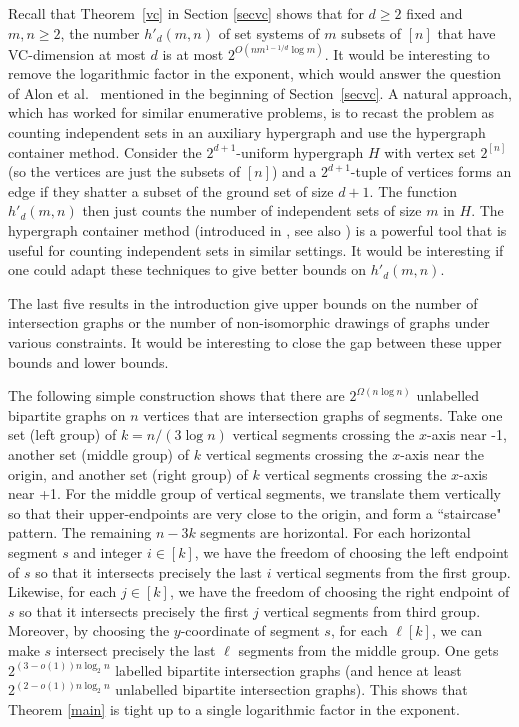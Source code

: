 \documentclass[11pt]{article}
\theoremstyle{plain}
\theoremstyle{definition}
\theoremstyle{remark}
\begin{document}
Recall that Theorem~\ref{vc} in Section \ref{secvc} shows that for $d \geq 2$ fixed and $m,n \geq 2$, the number $h'_d(m,n)$ of set systems of $m$ subsets of $[n]$ that have VC-dimension at most $d$ is at most $2^{O(nm^{1-1/d}\log m)}$. It would be interesting to remove the logarithmic factor in the exponent, which would answer the question of Alon et al.~\cite{alon} mentioned in the beginning of Section~\ref{secvc}. A natural approach, which has worked for similar enumerative problems, is to recast the problem as counting independent sets in an auxiliary hypergraph and use the hypergraph container method. Consider the $2^{d+1}$-uniform hypergraph $H$ with vertex set $2^{[n]}$ (so the vertices are just the subsets of $[n]$) and a $2^{d+1}$-tuple of vertices forms an edge if they shatter a subset of the ground set of size $d+1$. The function $h'_{d}(m,n)$ then just counts the number of independent sets of size $m$ in $H$. The hypergraph container method (introduced in \cite{BMS0,ST15}, see also \cite{BMS}) is a powerful tool that is useful for counting independent sets in similar settings. It would be interesting if one could adapt these techniques to give better bounds on $h'_d(m,n)$. 

The last five results in the introduction give upper bounds on the number of intersection graphs or the number of non-isomorphic drawings of graphs under various constraints. It would be interesting to close the gap between these upper bounds and lower bounds. 

The following simple construction shows that there are $2^{\Omega(n\log n)}$ unlabelled bipartite graphs on $n$ vertices that are intersection graphs of segments. Take one set (left group) of $k=n/(3\log n)$ vertical segments crossing the $x$-axis near -1, another set (middle group) of $k$ vertical segments crossing the $x$-axis near the origin, and another set (right group) of $k$ vertical segments crossing the $x$-axis near +1. For the middle group of vertical segments, we translate them vertically so that their upper-endpoints are very close to the origin, and form a ``staircase" pattern.  The remaining $n - 3k$ segments are horizontal.  For each horizontal segment $s$ and integer $i \in [k]$, we have the freedom of choosing the left endpoint of $s$ so that it intersects precisely the last $i$ vertical segments from the first group.  Likewise, for each $j\in [k]$, we have the freedom of choosing the right endpoint of $s$ so that it intersects precisely the first $j$ vertical segments from third group.  Moreover, by choosing the $y$-coordinate of segment $s$, for each $\ell [k]$, we can make $s$ intersect precisely the last $\ell$ segments from the middle group.  One gets $2^{(3-o(1))n\log_2 n}$ labelled bipartite intersection graphs (and hence at least $2^{(2-o(1))n \log_2 n}$ unlabelled bipartite intersection graphs). This shows that Theorem \ref{main} is tight up to a single logarithmic factor in the exponent. 
\end{document}
